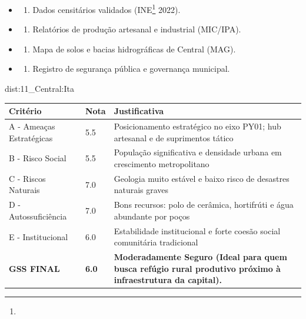 {\begin{itemize}
\tightlist
\item
  \begin{enumerate}
  \def\labelenumi{\arabic{enumi})}
  \tightlist
  \item
    Dados censitários validados (INE\footnote{\fineINE} 2022).
  \end{enumerate}
\item
  \begin{enumerate}
  \def\labelenumi{\arabic{enumi})}
  \setcounter{enumi}{1}
  \tightlist
  \item
    Relatórios de produção artesanal e industrial (MIC/\allowbreak IPA).
  \end{enumerate}
\item
  \begin{enumerate}
  \def\labelenumi{\arabic{enumi})}
  \setcounter{enumi}{2}
  \tightlist
  \item
    Mapa de solos e bacias hidrográficas de Central (MAG).
  \end{enumerate}
\item
  \begin{enumerate}
  \def\labelenumi{\arabic{enumi})}
  \setcounter{enumi}{3}
  \tightlist
  \item
    Registro de segurança pública e governança municipal.
  \end{enumerate}
\end{itemize}}{dist:11_Central:Ita}
\begin{table}[ht!]
\small \begin{tabular}{p{3.0cm}p{0.8cm}p{6.0cm}} \toprule
\textbf{Critério} & \textbf{Nota} & \textbf{Justificativa} \\ \midrule
A - Ameaças Estratégicas & 5.5 & Posicionamento estratégico no eixo PY01; hub artesanal e de suprimentos tático \\
B - Risco Social & 5.5 & População significativa e densidade urbana em crescimento metropolitano \\
C - Riscos Naturais & 7.0 & Geologia muito estável e baixo risco de desastres naturais graves \\
D - Autossuficiência & 7.0 & Bons recursos: polo de cerâmica, hortifrúti e água abundante por poços \\
E - Institucional & 6.0 & Estabilidade institucional e forte coesão social comunitária tradicional \\
\midrule \textbf{GSS FINAL} & \textbf{6.0} & \textbf{Moderadamente Seguro (Ideal para quem busca refúgio rural produtivo próximo à infraestrutura da capital).} \\ \bottomrule \end{tabular}
\end{table}
